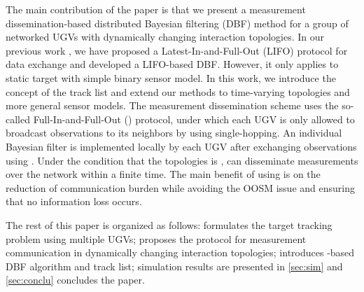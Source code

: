 	The main contribution of the paper is that we present a measurement dissemination-based distributed Bayesian filtering (DBF) method for a group of networked UGVs with dynamically changing interaction topologies. 
	In our previous work \cite{liu2016distributed}, we have proposed a Latest-In-and-Full-Out (LIFO) protocol for data exchange and developed a LIFO-based DBF. 
	However, it only applies to static target with simple binary sensor model.
	In this work, we introduce the concept of the track list and extend our methods to time-varying topologies and more general sensor models.
	The measurement dissemination scheme uses the so-called Full-In-and-Full-Out (\proto) protocol, under which each UGV is only allowed to broadcast observations to its neighbors by using single-hopping.
	An individual Bayesian filter is implemented locally by each UGV after exchanging observations using \proto.
	Under the condition that the topologies is \fc, {\proto} can disseminate measurements over the network within a finite time.
	The main benefit of using {\proto} is on the reduction of communication burden while avoiding the OOSM issue and ensuring that no information loss occurs.
	
	The rest of this paper is organized as follows: 
	 formulates the target tracking problem using multiple UGVs;
	 proposes the {\proto} protocol for measurement communication in dynamically changing interaction topologies;
	 introduces \proto-based DBF algorithm and track list;
	simulation results are presented in \cref{sec:sim} and \cref{sec:conclu} concludes the paper.